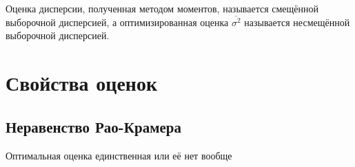 Оценка дисперсии, полученная методом моментов, называется смещённой выборочной
дисперсией, а оптимизированная оценка $\overline{\sigma^2}$ называется
несмещённой выборочной дисперсией.

\section{Свойства оценок}
\subsection{Неравенство Рао-Крамера}
\begin{theorem}
  \label{theorem:Kolmogorov}
  Оптимальная оценка единственная или её нет вообще
\end{theorem}
